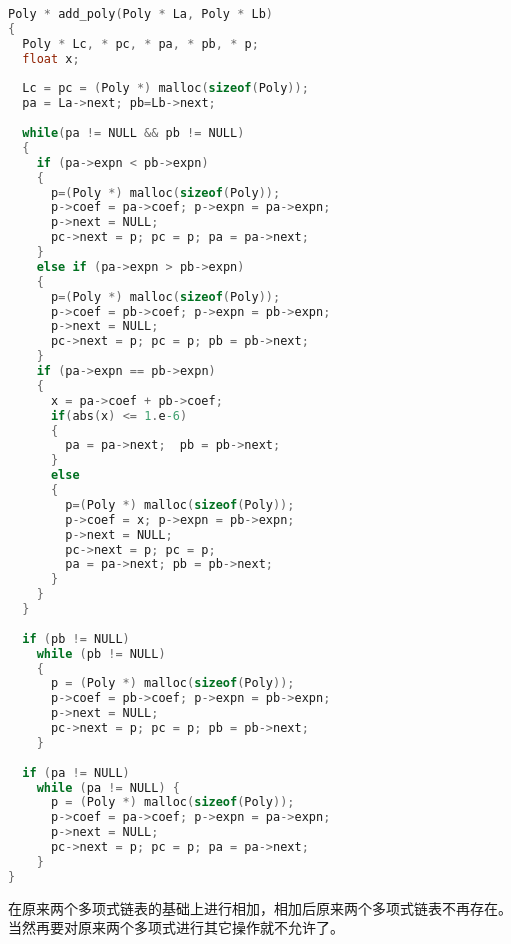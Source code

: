 \begin{frame}
\begin{lstlisting}[language=C,frame=none,extendedchars=false]
Poly * add_poly(Poly * La, Poly * Lb)
{
  Poly * Lc, * pc, * pa, * pb, * p; 
  float x;
  
  Lc = pc = (Poly *) malloc(sizeof(Poly)); 
  pa = La->next; pb=Lb->next;
  
  while(pa != NULL && pb != NULL)
  {
    if (pa->expn < pb->expn)
    {
      p=(Poly *) malloc(sizeof(Poly)); 
      p->coef = pa->coef; p->expn = pa->expn;
      p->next = NULL;
      pc->next = p; pc = p; pa = pa->next;
    } 
    else if (pa->expn > pb->expn)
    {
      p=(Poly *) malloc(sizeof(Poly)); 
      p->coef = pb->coef; p->expn = pb->expn;
      p->next = NULL;
      pc->next = p; pc = p; pb = pb->next;
    } 
    if (pa->expn == pb->expn)
    {
      x = pa->coef + pb->coef;
      if(abs(x) <= 1.e-6)
      {
        pa = pa->next;  pb = pb->next;  
      } 
      else 
      {
        p=(Poly *) malloc(sizeof(Poly));
        p->coef = x; p->expn = pb->expn;
        p->next = NULL;
        pc->next = p; pc = p; 
        pa = pa->next; pb = pb->next;  
      }
    }
  }
  
  if (pb != NULL)  
    while (pb != NULL) 
    {
      p = (Poly *) malloc(sizeof(Poly));
      p->coef = pb->coef; p->expn = pb->expn;
      p->next = NULL;
      pc->next = p; pc = p; pb = pb->next;
    }
    
  if (pa != NULL)  
    while (pa != NULL) {
      p = (Poly *) malloc(sizeof(Poly));
      p->coef = pa->coef; p->expn = pa->expn;
      p->next = NULL;
      pc->next = p; pc = p; pa = pa->next;
    }
}
\end{lstlisting}
\end{frame}	



\begin{frame}[fragile]
在原来两个多项式链表的基础上进行相加，相加后原来两个多项式链表不再存在。当然再要对原来两个多项式进行其它操作就不允许了。
\end{frame}

